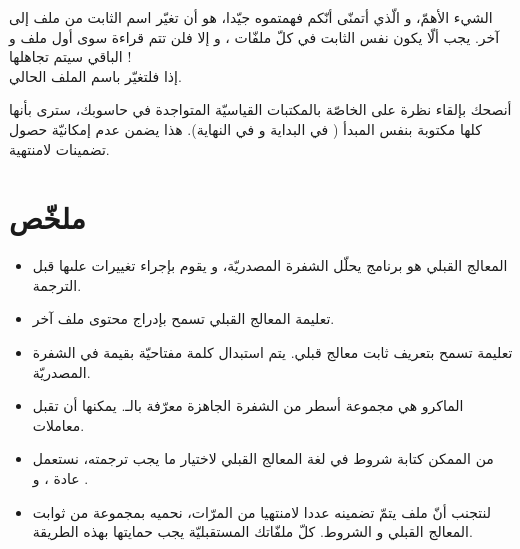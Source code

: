 الشيء الأهمّ، و الّذي أتمنّى أنّكم فهمتموه جيّدا، هو أن تغيّر اسم الثابت من ملف
إلى آخر. يجب ألّا يكون نفس الثابت في كلّ ملفّات
،
و إلا فلن تتم قراءة سوى أول ملف
و الباقي سيتم تجاهلها !\\
إذا فلتغيّر
باسم الملف الحالي.
\begin{information}
أنصحك بإلقاء نظرة على
الخاصّة بالمكتبات القياسيّة المتواجدة في حاسوبك، سترى بأنها
كلها
مكتوبة بنفس المبدأ
(
في البداية و
في النهاية). هذا يضمن عدم إمكانيّة حصول تضمينات لامنتهية.
\end{information}

\section*{ملخّص}
\begin{itemize}
  \item المعالج القبلي هو برنامج يحلّل الشفرة المصدريّة، و يقوم بإجراء تغييرات علىها قبل الترجمة.
  \item تعليمة المعالج القبلي
تسمح بإدراج محتوى ملف آخر.
  \item تعليمة
تسمح بتعريف ثابت معالج قبلي. يتم استبدال كلمة مفتاحيّة بقيمة في الشفرة المصدريّة.
  \item الماكرو هي مجموعة أسطر من الشفرة الجاهزة معرّفة بالـ.
يمكنها أن تقبل معاملات.
  \item من الممكن كتابة شروط في لغة المعالج القبلي لاختيار ما يجب ترجمته، نستعمل عادة
،
و
.
  \item لنتجنب أنّ ملف
يتمّ تضمينه عددا لامنتهيا من المرّات، نحميه بمجموعة من ثوابت المعالج القبلي و الشروط. كلّ ملفّاتك
المستقبليّة يجب حمايتها بهذه الطريقة.
\end{itemize}
